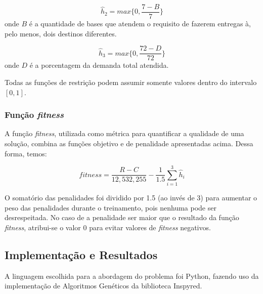 \documentclass[11pt]{article}
\begin{document}
\[\hat h_2 = max\{0, \frac{7 - B}{7}\}\] onde \(B\) é a quantidade de
bases que atendem o requisito de fazerem entregas à, pelo menos, dois
destinos diferentes.

\[\hat h_3 = max\{0, \frac{72 - D}{72}\}\] onde \(D\) é a porcentagem da
demanda total atendida.

Todas as funções de restrição podem assumir somente valores dentro do
intervalo \([0, 1]\).

    \hypertarget{funuxe7uxe3o-fitness}{%
\subsubsection{\texorpdfstring{Função
\emph{fitness}}{Função fitness}}\label{funuxe7uxe3o-fitness}}

A função \emph{fitness}, utilizada como métrica para quantificar a
qualidade de uma solução, combina as funções objetivo e de penalidade
apresentadas acima. Dessa forma, temos:

\[fitness = \frac{R - C}{12,532,255} - \frac{1}{1.5}\sum_{i=1}^{3}\hat h_i\]

O somatório das penalidades foi dividido por 1.5 (ao invés de 3) para
aumentar o peso das penalidades durante o treinamento, pois nenhuma pode
ser desrespeitada. No caso de a penalidade ser maior que o resultado da
função \emph{fitness}, atribui-se o valor 0 para evitar valores de \emph{fitness} negativos.

    \hypertarget{implementauxe7uxe3o}{%
\subsection{Implementação e Resultados}\label{implementauxe7uxe3o}}

A linguagem escolhida para a abordagem do problema foi Python, fazendo
uso da implementação de Algoritmos Genéticos da biblioteca Inspyred.
\end{document}
